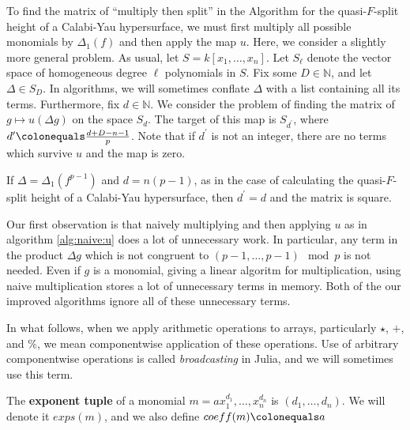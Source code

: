 
To find the matrix of ``multiply then split''
in the Algorithm for the quasi-\(F\)-split height
of a Calabi-Yau hypersurface, 
we must first multiply all possible 
monomials by \(\Delta_{1}(f)\) 
and then apply the map \(u\).
Here, we consider a slightly more general problem.
As usual, let \(S = k[x_{1}, \ldots, x_{n}]\).
Let $S_\ell$ denote the vector space of homogeneous degree $\ell$ polynomials in \(S\).
Fix some \(D \in \mathbb{N}\), and let \(\Delta \in S_D\).
In algorithms, we will sometimes conflate \(\Delta\) 
with a list containing all its terms.
Furthermore, fix \(d \in \mathbb{N}\).
We consider the problem of finding the matrix of 
\(g \mapsto u(\Delta g)\)
on the space \(S_{d}\).
The target of this map is
\(S_{d^{\prime}}\), where
\(d^{\prime} \colonequals \frac{d+D-n-1}{p}\).
Note that if \(d^{\prime}\) is not an integer,
there are no terms which survive \(u\) and
the map is zero.

\begin{rmk}
    If \(\Delta = \Delta_{1}(f^{p-1})\) and \(d = n(p-1)\),
	as in the case of calculating the quasi-\(F\)-split
	height of a Calabi-Yau hypersurface, 
	then \(d^{\prime} = d\) and the matrix is 
	square.
\end{rmk}

Our first observation is that naively 
multiplying and then applying \(u\) 
as in algorithm \ref{alg:naive:u}
does a lot of unnecessary work.
In particular, any term in the 
product \(\Delta g\) which 
is not congruent to 
\((p-1, \ldots, p-1) \mod p\)
is not needed. 
Even if \(g\) is a monomial, giving a linear
algoritm for multiplication, using naive
multiplication stores a lot of unnecessary terms
in memory.
Both of the our improved algorithms ignore
all of these unnecessary terms.

In what follows, 
when we apply arithmetic operations to arrays, 
particularly \(\star\), \(+\), and \(\%\),
we mean componentwise application of these operations.
Use of arbitrary componentwise operations is called
\textit{broadcasting} in Julia, and we will
sometimes use this term.

\begin{defn}
    The \textbf{exponent tuple} of a monomial $m = ax_{1}^{d_1}, \dots, x_{n}^{d_n}$ is $(d_1, \dots, d_n)$. 
	We will denote it $exps(m)$, and we also define $coeff(m) \colonequals a$
\end{defn}

